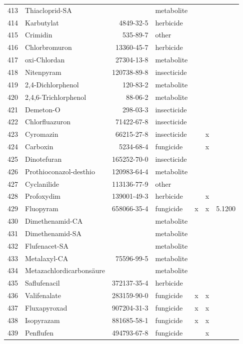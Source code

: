 \begin{longtable}{lp{3cm}rlp{0.5cm}p{0.5cm}p{1.5cm}}
  413 & Thiacloprid-SA &  & metabolite &  &  &  \\ 
  414 & Karbutylat & 4849-32-5 & herbicide &  &  &  \\ 
  415 & Crimidin & 535-89-7 & other &  &  &  \\ 
  416 & Chlorbromuron & 13360-45-7 & herbicide &  &  &  \\ 
  417 & oxi-Chlordan & 27304-13-8 & metabolite &  &  &  \\ 
  418 & Nitenpyram & 120738-89-8 & insecticide &  &  &  \\ 
  419 & 2,4-Dichlorphenol & 120-83-2 & metabolite &  &  &  \\ 
  420 & 2,4,6-Trichlorphenol & 88-06-2 & metabolite &  &  &  \\ 
  421 & Demeton-O & 298-03-3 & insecticide &  &  &  \\ 
  422 & Chlorfluazuron & 71422-67-8 & insecticide &  &  &  \\ 
  423 & Cyromazin & 66215-27-8 & insecticide &  & x &  \\ 
  424 & Carboxin & 5234-68-4 & fungicide &  & x &  \\ 
  425 & Dinotefuran & 165252-70-0 & insecticide &  &  &  \\ 
  426 & Prothioconazol-desthio & 120983-64-4 & metabolite &  &  &  \\ 
  427 & Cyclanilide & 113136-77-9 & other &  &  &  \\ 
  428 & Profoxydim & 139001-49-3 & herbicide &  & x &  \\ 
  429 & Fluopyram & 658066-35-4 & fungicide & x & x & 5.1200 \\ 
  430 & Dimethenamid-CA &  & metabolite &  &  &  \\ 
  431 & Dimethenamid-SA &  & metabolite &  &  &  \\ 
  432 & Flufenacet-SA &  & metabolite &  &  &  \\ 
  433 & Metalaxyl-CA & 75596-99-5 & metabolite &  &  &  \\ 
  434 & Metazachlordicarbonsäure &  & metabolite &  &  &  \\ 
  435 & Saflufenacil & 372137-35-4 & herbicide &  &  &  \\ 
  436 & Valifenalate & 283159-90-0 & fungicide & x & x &  \\ 
  437 & Fluxapyroxad & 907204-31-3 & fungicide & x & x &  \\ 
  438 & Isopyrazam & 881685-58-1 & fungicide & x & x &  \\ 
  439 & Penflufen & 494793-67-8 & fungicide &  & x &  \\ 

\end{longtable}

